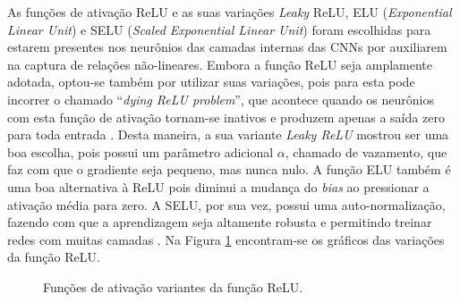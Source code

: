 As funções de ativação ReLU e as suas variações \emph{Leaky} ReLU, ELU (\emph{Exponential Linear Unit}) e SELU (\emph{Scaled Exponential Linear Unit}) foram escolhidas para estarem presentes nos neurônios das camadas internas das CNNs por auxiliarem na captura de relações não-lineares. Embora a função ReLU seja amplamente adotada, optou-se também por utilizar suas variações, pois para esta pode incorrer o chamado ``\emph{dying ReLU problem}'', que acontece quando os neurônios com esta função de ativação tornam-se inativos e produzem apenas a saída zero para toda entrada \cite{reluDying}.  Desta maneira, a sua variante \emph{Leaky ReLU} mostrou ser uma boa escolha, pois possui um parâmetro adicional $\alpha$, chamado de vazamento, que faz com que o gradiente seja pequeno, mas nunca nulo. A função ELU também é uma boa alternativa à ReLU pois diminui a mudança do \emph{bias} ao pressionar a ativação média para zero. A SELU, por sua vez, possui uma auto-normalização, fazendo com que a aprendizagem seja altamente robusta e permitindo treinar redes com muitas camadas \cite{relu}. Na Figura \ref{fig:relu-variants} encontram-se os gráficos das variações da função ReLU.

\begin{figure}[h!]
	\centering
	\caption{Funções de ativação variantes da função ReLU.}\label{fig:relu-variants}
	\hfill
\end{figure}

